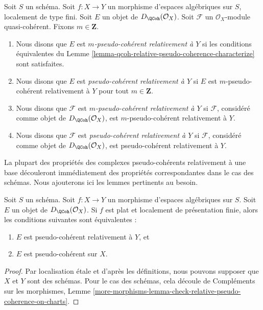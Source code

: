 \begin{definition}
\label{definition-relative-pseudo-coherence}
Soit $S$ un schéma. Soit $f : X \to Y$ un morphisme d'espaces
algébriques sur $S$, localement de type fini.
Soit $E$ un objet de $D_\QCoh(\mathcal{O}_X)$. Soit $\mathcal{F}$ un
$\mathcal{O}_X$-module quasi-cohérent. Fixons $m \in \mathbf{Z}$.
\begin{enumerate}
\item Nous disons que $E$ est {\it $m$-pseudo-cohérent relativement à $Y$}
si les conditions équivalentes du
Lemme \ref{lemma-qcoh-relative-pseudo-coherence-characterize} sont satisfaites.
\item Nous disons que $E$ est {\it pseudo-cohérent relativement à $Y$}
si $E$ est $m$-pseudo-cohérent relativement à $Y$ pour tout $m \in \mathbf{Z}$.
\item Nous disons que $\mathcal{F}$ est {\it $m$-pseudo-cohérent relativement à $Y$} si
$\mathcal{F}$, considéré comme objet de $D_\QCoh(\mathcal{O}_X)$, est
$m$-pseudo-cohérent relativement à $Y$.
\item Nous disons que $\mathcal{F}$ est {\it pseudo-cohérent relativement à $Y$} si
$\mathcal{F}$, considéré comme objet de $D_\QCoh(\mathcal{O}_X)$, est
pseudo-cohérent relativement à $Y$.
\end{enumerate}
\end{definition}

\noindent
La plupart des propriétés des complexes pseudo-cohérents relativement à une base
découleront immédiatement des propriétés correspondantes dans le cas
des schémas. Nous ajouterons ici les lemmes pertinents au besoin.

\begin{lemma}
\label{lemma-relative-pseudo-coherent-is-moot}
Soit $S$ un schéma. Soit $f : X \to Y$ un morphisme d'espaces
algébriques sur $S$. Soit $E$ un objet de $D_\QCoh(\mathcal{O}_X)$.
Si $f$ est plat et localement de présentation finie, alors
les conditions suivantes sont équivalentes :
\begin{enumerate}
\item $E$ est pseudo-cohérent relativement à $Y$, et
\item $E$ est pseudo-cohérent sur $X$.
\end{enumerate}
\end{lemma}

\begin{proof}
Par localisation étale et d'après les définitions, nous pouvons supposer
que $X$ et $Y$ sont des schémas. Pour le cas des schémas, cela découle de
Compléments sur les morphismes, Lemme
\ref{more-morphisms-lemma-check-relative-pseudo-coherence-on-charts}.
\end{proof}


















